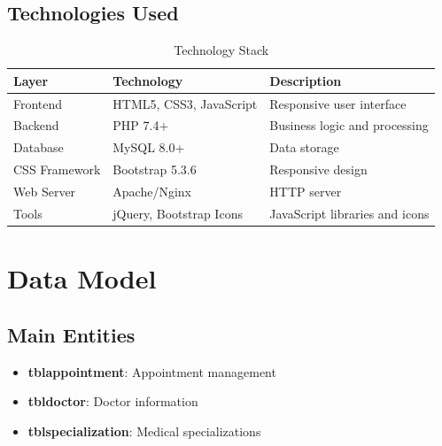 \documentclass[12pt,a4paper]{report}
\begin{document}
\subsection{Technologies Used}
\begin{table}[H]
\centering
\begin{tabular}{|l|l|l|}
\hline
\textbf{Layer} & \textbf{Technology} & \textbf{Description} \\
\hline
Frontend & HTML5, CSS3, JavaScript & Responsive user interface \\
\hline
Backend & PHP 7.4+ & Business logic and processing \\
\hline
Database & MySQL 8.0+ & Data storage \\
\hline
CSS Framework & Bootstrap 5.3.6 & Responsive design \\
\hline
Web Server & Apache/Nginx & HTTP server \\
\hline
Tools & jQuery, Bootstrap Icons & JavaScript libraries and icons \\
\hline
\end{tabular}
\caption{Technology Stack}
\end{table}

\section{Data Model}

\subsection{Main Entities}
\begin{itemize}
    \item \textbf{tblappointment}: Appointment management
    \item \textbf{tbldoctor}: Doctor information
    \item \textbf{tblspecialization}: Medical specializations
\end{itemize}
\end{document}
